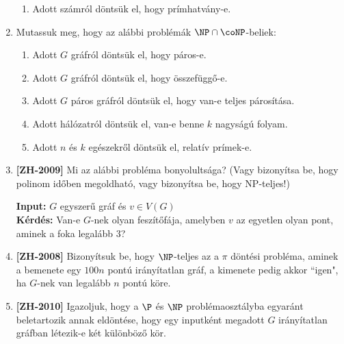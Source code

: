 \documentclass[a4paper, 12pt]{article}
\begin{document}
\begin{enumerate}
\begin{enumerate}
                \item Adott számról döntsük el, hogy prímhatvány-e.
            \end{enumerate}
            \item Mutassuk meg, hogy az alábbi problémák $\NP \cap \coNP$-beliek:
            \begin{enumerate}
                \item Adott $G$ gráfról döntsük el, hogy páros-e.
                \item Adott $G$ gráfról döntsük el, hogy összefüggő-e.
                \item Adott $G$ páros gráfról döntsük el, hogy van-e teljes párosítása.
                \item Adott hálózatról döntsük el, van-e benne $k$ nagyságú folyam.
                \item Adott $n$ és $k$ egészekről döntsük el, relatív prímek-e.
            \end{enumerate}
            \item \textbf{[ZH-2009]} Mi az alábbi probléma bonyolultsága? (Vagy bizonyítsa be, hogy polinom időben megoldható, vagy bizonyítsa be, hogy NP-teljes!)
            
            \textbf{Input:} $G$ egyszerű gráf és $v\in V(G)$\\
            \textbf{Kérdés:} Van-e $G$-nek olyan feszítőfája, amelyben $v$ az egyetlen olyan pont, aminek a foka legalább $3$?

            \item \textbf{[ZH-2008]} Bizonyítsuk be, hogy $\NP$-teljes az a $\pi$ döntési probléma, aminek a bemenete egy $100n$ pontú irányítatlan gráf, a kimenete pedig akkor ``igen", ha $G$-nek van legalább $n$ pontú köre. 
            
            \item \textbf{[ZH-2010]} Igazoljuk, hogy a $\P$ és $\NP$ problémaosztályba egyaránt beletartozik annak eldöntése, hogy egy inputként megadott $G$ irányítatlan gráfban létezik-e két különböző kör.
            

\end{enumerate}
\end{document}
